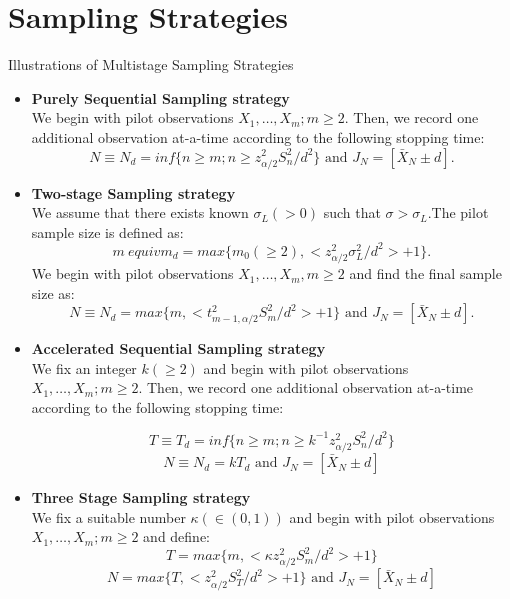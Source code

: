 \documentclass [xcolor=svgnames, t] {beamer}
\begin{document}
\section{Sampling Strategies}
\begin{frame}{Illustrations of Multistage Sampling Strategies}
    \begin{itemize}
    \item \textbf{Purely Sequential Sampling strategy}
\\ We begin with pilot observations $X_1,\dots ,X_m; m\ge 2$. Then, we record one additional observation at-a-time according to the following stopping
time:
\begin{equation*}
    N \equiv N_d=inf\{ n \ge m; n \ge z^2_{\alpha/2}S_n^2/d^2 \}  \textrm{ and }  J_N=[\bar{X}_N \pm d].
\end{equation*}
\item \textbf{Two-stage Sampling strategy}
    \\ We assume that there exists known $\sigma_L(>0)$ such that $\sigma>\sigma_L$.The pilot sample size is defined as:
    $$m\ equiv m_d=max \{ m_0(\ge 2),<z^2_{\alpha/2}\sigma_L^2/d^2>+1\}.$$
    We begin with pilot observations $X_1,\dots ,X_m, m \ge 2$ and find the final sample size as:
    \begin{equation*}
    N \equiv N_d=max\{ m,< t^2_{m-1,\alpha/2}S_m^2/d^2>+1\} \text{ and } J_N=[\bar{X}_N \pm d].
\end{equation*}
    \end{itemize}
\end{frame}
\begin{frame}
    \begin{itemize}
\item \textbf{Accelerated Sequential Sampling strategy}\\
We fix an integer $k(\geq 2)$ and begin with pilot observations $X_1,\dots ,X_m; m\ge 2$. Then, we record one additional observation at-a-time according to the following stopping
time:

        
        $$ T \equiv T_d=inf\{ n \ge m; n \ge k^{-1}z^2_{\alpha/2}S_n^2/d^2 \} $$ 
        $$ N \equiv N_d = kT_d  \text{ and } J_N=[\bar{X}_N \pm d] $$
 
\item \textbf{Three Stage Sampling strategy}\\
We fix a suitable number $\kappa(\in (0,1))$ and begin with pilot observations $X_1,\dots ,X_m; m\ge 2$ and define:
        $$ T =max\{  m,  <\kappa z^2_{\alpha/2}S_m^2/d^2 >+1\} $$ 
        $$ N =max \{ T,  <z^2_{\alpha/2}S_T^2/d^2 >+1\}  \text{ and } J_N=[\bar{X}_N \pm d] $$
 

    \end{itemize}
\end{frame}
\end{document}
